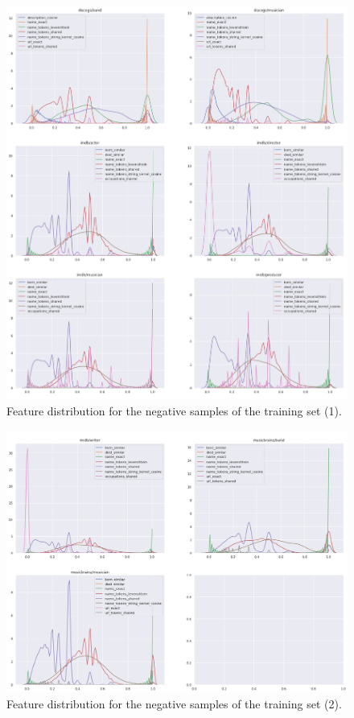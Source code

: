 \documentclass[epsfig,a4paper,11pt,titlepage,twoside,openany]{book}
\begin{document}
\begin{figure}[H]
      \centering
      \includegraphics[width=\linewidth]{features_distribution_negative_samples_1}
      \caption{Feature distribution for the negative samples of the training set (1).}
      \label{fig:distribution-of-training-negative-features-1}
\end{figure}

\begin{figure}[H]
      \centering
      \includegraphics[width=\linewidth]{features_distribution_negative_samples_2}
      \caption{Feature distribution for the negative samples of the training set (2).}
      \label{fig:distribution-of-training-negative-features-2}
\end{figure}
\end{document}
